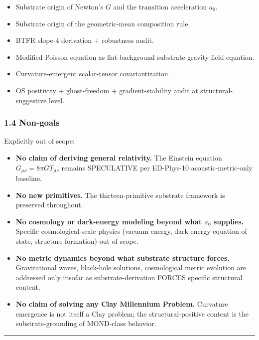 \documentclass[
]{article}
\providecommand{\tightlist}{%
  \setlength{\itemsep}{0pt}\setlength{\parskip}{0pt}}
\begin{document}
\begin{itemize}
\tightlist
\item
  Substrate origin of Newton's \(G\) and the transition acceleration
  \(a_0\).
\item
  Substrate origin of the geometric-mean composition rule.
\item
  BTFR slope-4 derivation + robustness audit.
\item
  Modified Poisson equation as flat-background substrate-gravity field
  equation.
\item
  Curvature-emergent scalar-tensor covariantization.
\item
  OS positivity + ghost-freedom + gradient-stability audit at
  structural-suggestive level.
\end{itemize}

\subsubsection{1.4 Non-goals}\label{non-goals}

Explicitly out of scope:

\begin{itemize}
\tightlist
\item
  \textbf{No claim of deriving general relativity.} The Einstein
  equation \(G_{\mu\nu} = 8\pi G T_{\mu\nu}\) remains SPECULATIVE per
  ED-Phys-10 acoustic-metric-only baseline.
\item
  \textbf{No new primitives.} The thirteen-primitive substrate framework
  is preserved throughout.
\item
  \textbf{No cosmology or dark-energy modeling beyond what \(a_0\)
  supplies.} Specific cosmological-scale physics (vacuum energy,
  dark-energy equation of state, structure formation) out of scope.
\item
  \textbf{No metric dynamics beyond what substrate structure forces.}
  Gravitational waves, black-hole solutions, cosmological metric
  evolution are addressed only insofar as substrate-derivation FORCES
  specific structural content.
\item
  \textbf{No claim of solving any Clay Millennium Problem.} Curvature
  emergence is not itself a Clay problem; the structural-positive
  content is the substrate-grounding of MOND-class behavior.
\end{itemize}

\begin{center}\rule{0.5\linewidth}{0.5pt}\end{center}
\end{document}
